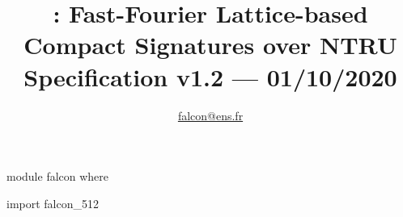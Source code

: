\documentclass[letterpaper,12pt]{book}
\title{\falcon: Fast-Fourier Lattice-based\\Compact Signatures over NTRU\\
\textsf{\large Specification v1.2 --- 01/10/2020}}
\author{%
\pierrealain \and%
\jeffrey \and%
\paul \and%
\vadim \and%
\thomaspo \and%
\thomaspr \and%
\thomasr \and%
\gregor \and%
\william \and%
\zhenfei
}
\date{\href{falcon@ens.fr}{\textsf{falcon@ens.fr}}}
\begin{document}
\maketitle

{
\setlength{\parskip}{.3ex}
\tableofcontents
}

\begin{code}
  module falcon where

  import falcon_512
\end{code}

% 



 


% 
\appendix
% 

{\small
}
\end{document}
